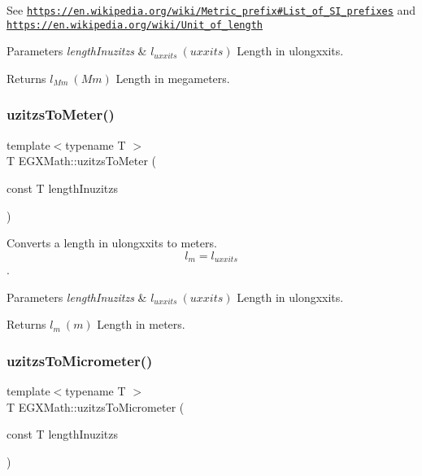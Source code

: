 See \href{https://en.wikipedia.org/wiki/Metric_prefix#List_of_SI_prefixes}{\tt https\+://en.\+wikipedia.\+org/wiki/\+Metric\+\_\+prefix\#\+List\+\_\+of\+\_\+\+S\+I\+\_\+prefixes} and \href{https://en.wikipedia.org/wiki/Unit_of_length}{\tt https\+://en.\+wikipedia.\+org/wiki/\+Unit\+\_\+of\+\_\+length} 
\begin{DoxyParams}{Parameters}
{\em length\+Inuzitzs} & $ l_{uxxits}\ (uxxits)$ Length in ulongxxits. \\
\hline
\end{DoxyParams}
\begin{DoxyReturn}{Returns}
$ l_{Mm}\ (Mm)$ Length in megameters. 
\end{DoxyReturn}
\mbox{\label{group___e_g_x_math-_conversions-_length_conversions-uzitzs-_s_i_gad256d80aa1424b503ded3fda023ee4dd}} 
\subsubsection{\texorpdfstring{uzitzs\+To\+Meter()}{uzitzsToMeter()}}
{\footnotesize\ttfamily template$<$typename T $>$ \\
T E\+G\+X\+Math\+::uzitzs\+To\+Meter (\begin{DoxyParamCaption}\item[{const T}]{length\+Inuzitzs }\end{DoxyParamCaption})}



Converts a length in ulongxxits to meters. \[ l_{m}=l_{uxxits} \]. 


\begin{DoxyParams}{Parameters}
{\em length\+Inuzitzs} & $ l_{uxxits}\ (uxxits)$ Length in ulongxxits. \\
\hline
\end{DoxyParams}
\begin{DoxyReturn}{Returns}
$ l_{m}\ (m)$ Length in meters. 
\end{DoxyReturn}
\mbox{\label{group___e_g_x_math-_conversions-_length_conversions-uzitzs-_s_i_ga0bd484a80b8b66cd5272bbbc1fe6b642}} 
\subsubsection{\texorpdfstring{uzitzs\+To\+Micrometer()}{uzitzsToMicrometer()}}
{\footnotesize\ttfamily template$<$typename T $>$ \\
T E\+G\+X\+Math\+::uzitzs\+To\+Micrometer (\begin{DoxyParamCaption}\item[{const T}]{length\+Inuzitzs }\end{DoxyParamCaption})}



